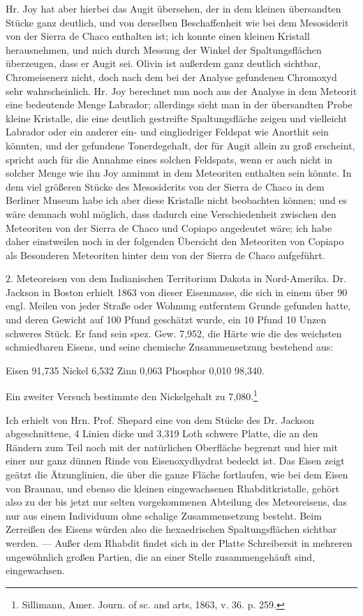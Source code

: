 \documentclass[a4paper, 11pt, oneside]{article}
\begin{document}
Hr. Joy hat aber hierbei das Augit übersehen, der in dem kleinen übersandten Stücke ganz deutlich, und von derselben Beschaffenheit wie bei dem Mesosiderit von der Sierra de Chaco enthalten ist; ich konnte einen kleinen Kristall herausnehmen, und mich durch Messung der Winkel der Spaltungsflächen überzeugen, dass er Augit sei. Olivin ist außerdem ganz deutlich sichtbar, Chromeisenerz nicht, doch nach dem bei der Analyse gefundenen Chromoxyd sehr wahrscheinlich. Hr. Joy berechnet nun noch aus der Analyse in dem Meteorit eine bedeutende Menge Labrador; allerdings sieht man in der übersandten Probe kleine Kristalle, die eine deutlich gestreifte Spaltungsfläche zeigen und vielleicht Labrador oder ein anderer ein- und eingliedriger Feldspat wie Anorthit sein könnten, und der gefundene Tonerdegehalt, der für Augit allein zu groß erscheint, spricht auch für die Annahme eines solchen Feldspats, wenn er auch nicht in solcher Menge wie ihn Joy annimmt in dem Meteoriten enthalten sein könnte. In dem viel größeren Stücke des Mesosiderits von der Sierra de Chaco in dem Berliner Museum habe ich aber diese Kristalle nicht beobachten können; und es wäre demnach wohl möglich, dass dadurch eine Verschiedenheit zwischen den Meteoriten von der Sierra de Chaco und Copiapo angedeutet wäre; ich habe daher einstweilen noch in der folgenden Übersicht den Meteoriten von Copiapo als Besonderen Meteoriten hinter dem von der Sierra de Chaco aufgeführt.

2. Meteoreisen von dem Indianischen Territorium Dakota in Nord-Amerika. Dr. Jackson in Boston erhielt 1863 von dieser Eisenmasse, die sich in einem über 90 engl. Meilen von jeder Straße oder Wohnung entferntem Grunde gefunden hatte, und deren Gewicht auf 100 Pfund geschätzt wurde, ein 10 Pfund 10 Unzen schweres Stück. Er fand sein spez. Gew. 7,952, die Härte wie die des weichsten schmiedbaren Eisens, und seine chemische Zusammensetzung bestehend aus:

Eisen 91,735  
Nickel 6,532  
Zinn 0,063  
Phosphor 0,010  
98,340.  

Ein zweiter Versuch bestimmte den Nickelgehalt zu 7,080.\footnote{Sillimann, Amer. Journ. of sc. and arts, 1863, v. 36. p. 259.}

Ich erhielt von Hrn. Prof. Shepard eine von dem Stücke des Dr. Jackson abgeschnittene, 4 Linien dicke und 3,319 Loth schwere Platte, die an den Rändern zum Teil noch mit der natürlichen Oberfläche begrenzt und hier mit einer nur ganz dünnen Rinde von Eisenoxydhydrat bedeckt ist. Das Eisen zeigt geätzt die Ätzunglinien, die über die ganze Fläche fortlaufen, wie bei dem Eisen von Braunau, und ebenso die kleinen eingewachsenen Rhabditkristalle, gehört also zu der bis jetzt nur selten vorgekommenen Abteilung des Meteoreisens, das nur aus einem Individuum ohne schalige Zusammensetzung besteht. Beim Zerreißen des Eisens würden also die hexaedrischen Spaltungsflächen sichtbar werden. --- Außer dem Rhabdit findet sich in der Platte Schreibersit in mehreren ungewöhnlich großen Partien, die an einer Stelle zusammengehäuft sind, eingewachsen.
\end{document}
